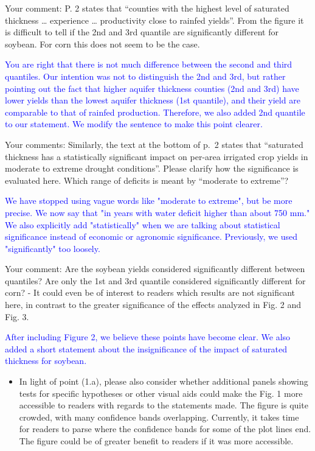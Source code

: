 \documentclass[
]{article}
\providecommand{\tightlist}{%
  \setlength{\itemsep}{0pt}\setlength{\parskip}{0pt}}
\begin{document}
Your comment: P. 2 states that ``counties with the highest level of
saturated thickness \ldots{} experience \ldots{} productivity close to
rainfed yields''. From the figure it is difficult to tell if the 2nd and
3rd quantile are significantly different for soybean. For corn this does
not seem to be the case.

\textcolor{blue}{
You are right that there is not much difference between the second and third quantiles. Our intention was not to distinguish the 2nd and 3rd, but rather pointing out the fact that higher aquifer thickness counties (2nd and 3rd) have lower yields than the lowest aquifer thickness (1st quantile), and their yield are comparable to that of rainfed production. Therefore, we also added 2nd quantile to our statement. We modify the sentence to make this point clearer.
}

Your comments: Similarly, the text at the bottom of p.~2 states that
``saturated thickness has a statistically significant impact on per-area
irrigated crop yields in moderate to extreme drought conditions''.
Please clarify how the significance is evaluated here. Which range of
deficits is meant by ``moderate to extreme''?

\textcolor{blue}{
We have stopped using vague words like "moderate to extreme", but be more precise. We now say that "in years with water deficit higher than about 750 mm." We also explicitly add "statistically" when we are talking about statistical significance instead of economic or agronomic significance. Previously, we used "significantly" too loosely.
}

Your comment: Are the soybean yields considered significantly different
between quantiles? Are only the 1st and 3rd quantile considered
significantly different for corn? - It could even be of interest to
readers which results are not significant here, in contrast to the
greater significance of the effects analyzed in Fig. 2 and Fig. 3.

\textcolor{blue}{After including Figure 2, we believe these points have become clear. We also added a short statement about the insignificance of the impact of saturated thickness for soybean.}

\begin{itemize}
\tightlist
\item
  In light of point (1.a), please also consider whether additional
  panels showing tests for specific hypotheses or other visual aids
  could make the Fig. 1 more accessible to readers with regards to the
  statements made. The figure is quite crowded, with many confidence
  bands overlapping. Currently, it takes time for readers to parse where
  the confidence bands for some of the plot lines end. The figure could
  be of greater benefit to readers if it was more accessible.
\end{itemize}
\end{document}
